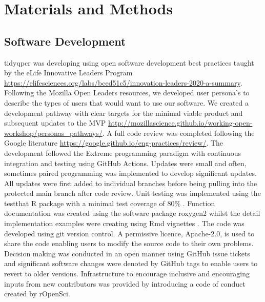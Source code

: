 \documentclass[../main.tex]{subfiles}
\begin{document}
\chapter{Materials and Methods}

\section{Software Development}

tidyqpcr was developing using open software development best practices taught by the eLife Innovative Leaders Program \url{https://elifesciences.org/labs/bced51c5/innovation-leaders-2020-a-summary}.
Following the Mozilla Open Leaders resources, we developed user persona's to describe the types of users that would want to use our software.
We created a development pathway with clear targets for the minimal viable product and subsequent updates to the MVP \url{http://mozillascience.github.io/working-open-workshop/personas_pathways/}.
A full code review was completed following the Google literature \url{https://google.github.io/eng-practices/review/}.
The development followed the Extreme programming paradigm with continuous integration and testing using GitHub Actions.
Updates were small and often, sometimes paired programming was implemented to develop significant updates.
All updates were first added to individual branches before being pulling into the protected main branch after code review.
Unit testing was implemented using the testthat R package with a minimal test coverage of 80\% \parencite{Wickham2011}.
Function documentation was created using the software package roxygen2 whilst the detail implementation examples were creating using Rmd vignettes \parencite{Wickham2022}.
The code was developed using git version control.
A permissive licence, Apache-2.0, is used to share the code enabling users to modify the source code to their own problems.
Decision making was conducted in an open manner using GitHub issue tickets and significant software changes were denoted by GitHub tags to enable users to revert to older versions.
Infrastructure to encourage inclusive and encouraging inputs from new contributors was provided by introducing a code of conduct created by rOpenSci.
\end{document}
